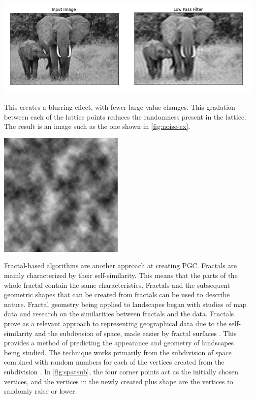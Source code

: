\documentclass[10pt]{report}
\begin{document}
		\begin{minipage}{\textwidth}
			\centering
			\includegraphics[scale=0.5]{lowpass}
			\label{fig:lpf}
		\end{minipage}
		
		This creates a blurring effect, with fewer large value changes. This gradation between each of the lattice points reduces the randomness present in the lattice. The result is an image such as the one shown in \autoref{fig:noise-ex}.
		
		\begin{minipage}{\textwidth}
			\centering
			\includegraphics[scale=1]{lect14-perlin}
			\label{fig:noise-ex}
		\end{minipage}

		Fractal-based algorithms are another approach at creating PGC. Fractals are mainly characterized by their self-similarity. This means that the parts of the whole fractal contain the same characteristics. Fractals and the subsequent geometric shapes that can be created from fractals can be used to describe nature. Fractal geometry being applied to landscapes began with studies of map data and research on the similarities between fractals and the data. Fractals prove as a relevant approach to representing geographical data due to the self-similarity and the subdivision of space, made easier by fractal surfaces \cite{doi:10.1111/j.1467-8306.1987.tb00158.x}. This provides a method of predicting the appearance and geometry of landscapes being studied. The technique works primarily from the subdivision of space combined with random numbers for each of the vertices created from the subdivision \cite{fractal-land}. In \autoref{fig:spatsub}, the four corner points act as the initially chosen vertices, and the vertices in the newly created plus shape are the vertices to randomly raise or lower. 
		
\end{document}
